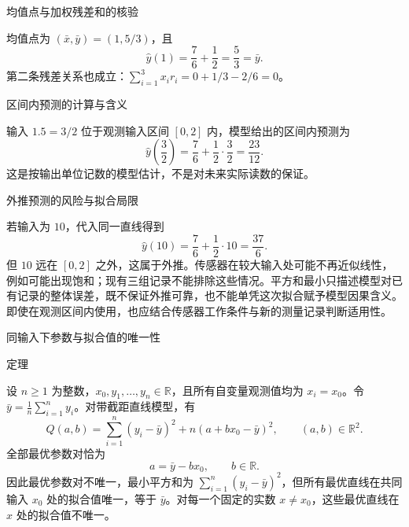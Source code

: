 \documentclass[aspectratio=169,10pt,fontset=fandol]{ctexbeamer}
\begin{document}
\begin{frame}[t,fragile]{均值点与加权残差和的核验}
\footnotesize
{\footnotesize
均值点为 $(\bar{x},\bar{y})=(1,5/3)$，且
\[
\hat{y}(1)=\frac76+\frac12=\frac53=\bar{y}.
\]
第二条残差关系也成立：$\sum_{i=1}^{3}x_i r_i=0+1/3-2/6=0$。


}
\end{frame}
\begin{frame}[t,fragile]{区间内预测的计算与含义}
\footnotesize
{\footnotesize
输入 $1.5=3/2$ 位于观测输入区间 $[0,2]$ 内，模型给出的区间内预测为
\[
\hat{y}\left(\frac32\right)=\frac76+\frac12\cdot\frac32
=\frac{23}{12}.
\]
这是按输出单位记数的模型估计，不是对未来实际读数的保证。


}
\end{frame}
\begin{frame}[t,fragile]{外推预测的风险与拟合局限}
\footnotesize
{\footnotesize
若输入为 $10$，代入同一直线得到
\[
\hat{y}(10)=\frac76+\frac12\cdot10=\frac{37}{6}.
\]
但 $10$ 远在 $[0,2]$ 之外，这属于外推。传感器在较大输入处可能不再近似线性，例如可能出现饱和；现有三组记录不能排除这些情况。平方和最小只描述模型对已有记录的整体误差，既不保证外推可靠，也不能单凭这次拟合赋予模型因果含义。即使在观测区间内使用，也应结合传感器工作条件与新的测量记录判断适用性。\par

}
\end{frame}
\begin{frame}[t,fragile]{同输入下参数与拟合值的唯一性}
\footnotesize
\begin{block}{定理}
{\footnotesize
设 $n\geq1$ 为整数，$x_0,y_1,\ldots,y_n\in\mathbb{R}$，且所有自变量观测值均为 $x_i=x_0$。令 $\bar{y}=\frac1n\sum_{i=1}^{n}y_i$。对带截距直线模型，有
\[
Q(a,b)=\sum_{i=1}^{n}(y_i-\bar{y})^2+n(a+bx_0-\bar{y})^2,
\qquad (a,b)\in\mathbb{R}^2.
\]
全部最优参数对恰为
\[
a=\bar{y}-bx_0,\qquad b\in\mathbb{R}.
\]
因此最优参数对不唯一，最小平方和为 $\sum_{i=1}^{n}(y_i-\bar{y})^2$，但所有最优直线在共同输入 $x_0$ 处的拟合值唯一，等于 $\bar{y}$。对每一个固定的实数 $x\ne x_0$，这些最优直线在 $x$ 处的拟合值不唯一。

}
\end{block}
\end{frame}
\end{document}

